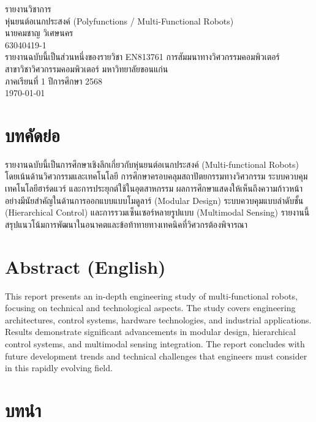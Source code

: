 \documentclass[12pt,a4paper]{article}
\begin{document}
\thispagestyle{empty}
\begin{center}
{\Large รายงานวิชาการ}\\[1em]
{\huge หุ่นยนต์อเนกประสงค์ (Polyfunctions / Multi-Functional Robots)}\\[1.2em]
{\Large นายคมชาญ วิเศษนคร}\\
{\large 63040419-1}\\[1em]
{\large รายงานฉบับนี้เป็นส่วนหนึ่งของรายวิชา EN813761 การสัมมนาทางวิศวกรรมคอมพิวเตอร์}\\
{\large สาขาวิชาวิศวกรรมคอมพิวเตอร์ มหาวิทยาลัยขอนแก่น}\\
{\large ภาคเรียนที่ 1 ปีการศึกษา 2568}\\[2em]
{\large \today}
\end{center}
\clearpage


\section*{บทคัดย่อ}
รายงานฉบับนี้เป็นการศึกษาเชิงลึกเกี่ยวกับหุ่นยนต์อเนกประสงค์ (Multi-functional Robots) โดยเน้นด้านวิศวกรรมและเทคโนโลยี การศึกษาครอบคลุมสถาปัตยกรรมทางวิศวกรรม ระบบควบคุม เทคโนโลยีฮาร์ดแวร์ และการประยุกต์ใช้ในอุตสาหกรรม ผลการศึกษาแสดงให้เห็นถึงความก้าวหน้าอย่างมีนัยสำคัญในด้านการออกแบบแบบโมดูลาร์ (Modular Design) ระบบควบคุมแบบลำดับชั้น (Hierarchical Control) และการรวมเซ็นเซอร์หลายรูปแบบ (Multimodal Sensing) รายงานนี้สรุปแนวโน้มการพัฒนาในอนาคตและข้อท้าทายทางเทคนิคที่วิศวกรต้องพิจารณา

\section*{Abstract (English)}
This report presents an in-depth engineering study of multi-functional robots, focusing on technical and technological aspects. The study covers engineering architectures, control systems, hardware technologies, and industrial applications. Results demonstrate significant advancements in modular design, hierarchical control systems, and multimodal sensing integration. The report concludes with future development trends and technical challenges that engineers must consider in this rapidly evolving field.

\tableofcontents
\clearpage

\section{บทนำ}
\end{document}
